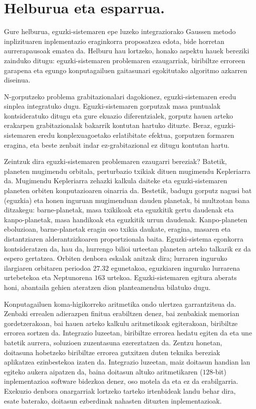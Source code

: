 \section{Helburua eta esparrua.}

Gure helburua, eguzki-sistemaren epe luzeko integraziorako Gaussen metodo inplizituaren inplementazio eraginkorra proposatzea edota, bide horretan aurrerapausoak ematea da. Helburu hau lortzeko, honako aspektu hauek bereziki zainduko ditugu: eguzki-sistemaren problemaren ezaugarriak, biribiltze erroreen garapena eta egungo konputagailuen gaitasunari egokitutako algoritmo azkarren diseinua.  

N-gorputzeko problema grabitazionalari dagokionez, eguzki-sistemaren eredu sinplea integratuko dugu. Eguzki-sistemaren gorputzak masa puntualak kontsideratuko ditugu eta gure ekuazio diferentzialek, gorputz hauen arteko erakarpen grabitazionalak bakarrik kontutan hartuko dituzte. Beraz, eguzki-sistemaren eredu konplexuagoetako erlatibitate efektua, gorputzen formaren eragina, eta beste zenbait indar ez-grabitazional ez ditugu kontutan hartu.

Zeintzuk dira eguzki-sistemaren problemaren ezaugarri bereziak? Batetik, planeten mugimendu orbitala, perturbazio txikiak dituen mugimendu Kepleriarra da. Mugimendu Kepleriarra  zehazki kalkula daiteke eta eguzki-sistemaren planeten orbiten konputazioaren oinarria da. Bestetik,  badugu gorputz nagusi bat (eguzkia) eta honen inguruan mugimenduan dauden planetak, bi multzotan bana ditzakegu: barne-planetak, masa txikikoak eta eguzkitik gertu daudenak eta kanpo-planetak, masa handikoak eta eguzkitik urrun daudenak. Kanpo-planeten eboluzioan, barne-planetak eragin oso txikia daukate, eragina, masaren eta distantziaren alderantzizkoaren proportzionala baita.  Eguzki-sistema egonkorra kontsideratzen da, hau da, hurrengo bilioi urteetan planeten arteko talkarik ez da espero gertatzea. Orbiten denbora eskalak anitzak dira; lurraren inguruko ilargiaren orbitaren periodoa $27.32$ egunetakoa, eguzkiaren inguruko lurrarena urtebetekoa eta Neptunorena $163$ urtekoa.  Eguzki-sistemaren egitura aberats honi, abantaila gehien ateratzen dion planteamendua bilatuko dugu.
  
Konputagailuen koma-higikorreko aritmetika ondo ulertzea garrantzitsua da. Zenbaki errealen adierazpen finitua erabiltzen denez, bai zenbakiak memorian gordetzerakoan, bai hauen arteko kalkulu aritmetikoak egiterakoan, biribiltze errorea sortzen da. Integrazio luzeetan, biribiltze errorea hedatu egiten da eta une batetik aurrera, soluzioen zuzentasuna ezereztatzen da. Zentzu honetan, doitasuna hobetzeko biribiltze errorea gutxitzen duten teknika bereziak aplikatzea ezinbestekoa izaten da. Integrazio luzeetan, maiz doitasun handian lan egiteko aukera aipatzen da, baina doitasun altuko aritmetikaren ($128$-bit) inplementazioa software bidezkoa denez, oso motela da eta ez da erabilgarria. Exekuzio denbora onargarriak lortzeko tarteko irtenbideak landu behar dira, esate baterako, doitasun ezberdinak nahasten dituzten inplementazioak.       

